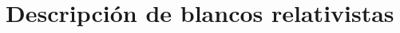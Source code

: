 \begin{comment}
So far, only one experimental work has been published regarding the 
stopping power cross section of pure hafnium for 
protons~\cite{Sirotinin}, while more attention has been recently given 
to studies involving hafnium oxide due to its practical 
use~\cite{Abril,Behar,Primetzhofer,Roth}. It is well known that 
significant attention has been paid in recent years to transition 
metal-oxides such as HfO$_2$ because of their potential as alternative 
gate dielectrics to replace SiO$_2$ for the future generation of 
nano-electronics with less than 45 nm gate length~\cite{Choi,Robertson}. 
Some important physical properties of the above mentioned metal-oxide 
films depend on their thickness, which is often measured by using 
Rutherford Backscattering Spectrometry~\cite{Alfassi01,Tesmer01}. This 
method relies on the determination of both the scattering cross section 
and also the stopping power of ion beams in the material of interest.

In this study, we report experimental stopping power cross sections over 
the incident energy range (0.6-2.5) MeV for protons crossing 
self-supported Hf thin-film by using the transmission method. We aim not 
only to upgrade stopping power data compilations~\cite{HPaul03,mondim17} 
but also to provide useful information about the processes governing the 
slowing down of protons in multi-electronic targets. In the rare earth 
metals, the $4f$ electrons play an essential role in the stopping power 
since they belong to the first shell of bound electrons below the 
conduction band. As already noted \cite{Roth17}, the free electron gas 
(FEG) shows unexpected behavior in these elements, which casts doubts on 
its proper description. In the case of Hf, we found the contribution of 
the $4f$-shell to be decisive even at impact energies around the 
stopping maximum, as will be shown later.
\end{comment}


\section{Descripción de blancos relativistas}
\label{sec:method-target}

